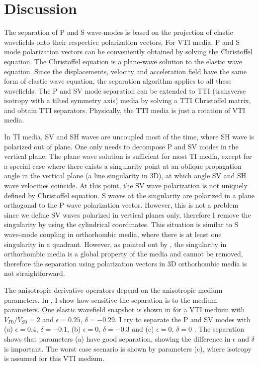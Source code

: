 

\section{Discussion}
The separation of P and S wave-modes is based on the projection of
elastic wavefields onto their respective polarization vectors. For VTI
media, P and S mode polarization vectors can be conveniently obtained
by solving the Christoffel equation. The Christoffel equation is a
plane-wave solution to the elastic wave equation. Since the
displacements, velocity and acceleration field have the same form of
elastic wave equation, the separation algorithm applies to all these
wavefields.  The P and SV mode separation can be extended to TTI
(transverse isotropy with a tilted symmetry axis) media by solving a
TTI Christoffel matrix, and obtain TTI separators. Physically, the TTI
media is just a rotation of VTI media.

In TI media, SV and SH waves are uncoupled most of the time, where SH
wave is polarized out of plane.  One only needs to decompose P and SV
modes in the vertical plane. The plane wave solution is sufficient for
most TI media, except for a special case where there exists a
singularity point at an oblique propagation angle in the vertical
plane (a line singularity in 3D), at which angle SV and SH wave
velocities coincide. At this point, the SV wave polarization is not
uniquely defined by Christoffel equation. S waves at the singularity
are polarized in a plane orthogonal to the P wave polarization
vector. However, this is not a problem since we define SV waves
polarized in vertical planes only, therefore I remove the singularity
by using the cylindrical coordinates. This situation is similar to S
wave-mode coupling in orthorhombic media, where there is at least one
singularity in a quadrant. {However, as pointed out
by \cite{GEO55-07-09140919}, the singularity in orthorhombic media is
a global property of the media and cannot be removed, therefore the
separation using polarization vectors in 3D orthorhombic media is not
straightforward.}





The anisotropic derivative operators depend on the anisotropic medium
parameters. In , I show how sensitive the
separation is to the medium parameters. One elastic wavefield snapshot
is shown in  for a VTI medium with
$V_{P0}/V_{S0}=2$ and $\epsilon=0.25$, $\delta=-0.29$. I try to separate
the P and SV modes with (a) $\epsilon=0.4$, $\delta=-0.1$, (b)
$\epsilon=0$, $\delta=-0.3$ and (c) $\epsilon=0$, $\delta=0$ . The
separation shows that parameters (a) have good separation, showing the
difference in $\epsilon$ and $\delta$ is important. The worst case
scenario is shown by parameters (c), where isotropy is assumed for
this VTI medium.

